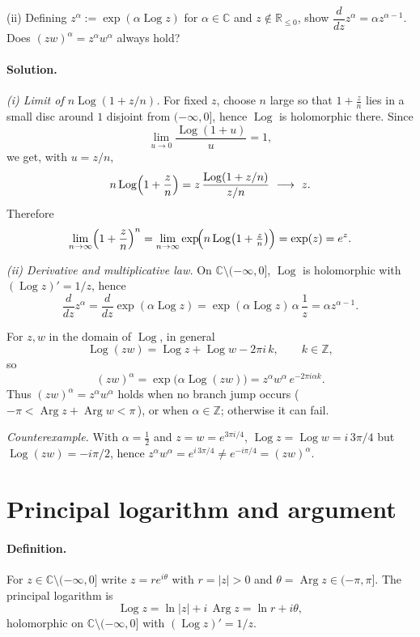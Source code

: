 \documentclass[11pt,a4paper]{article}
\theoremstyle{definition}
\theoremstyle{definition}
\theoremstyle{plain}
\theoremstyle{remark}
\DeclareMathOperator{\Log}{Log}
\DeclareMathOperator{\Arg}{Arg}
\begin{document}
(ii) Defining $z^\alpha:=\exp(\alpha\Log z)$ for $\alpha\in\mathbb C$ and $z\notin\mathbb R_{\le 0}$,
show $\dfrac{d}{dz}z^\alpha=\alpha z^{\alpha-1}$. Does $(zw)^\alpha=z^\alpha w^\alpha$ always hold?

\paragraph{Solution.}

\emph{(i) Limit of $n\Log(1+z/n)$.}
For fixed $z$, choose $n$ large so that $1+\frac{z}{n}$ lies in a small disc around $1$
disjoint from $(-\infty,0]$, hence $\Log$ is holomorphic there. Since
\[
\lim_{u\to 0}\frac{\Log(1+u)}{u}=1,
\]
we get, with $u=z/n$,
\[
n\Log\Bigl(1+\frac{z}{n}\Bigr)
= z\,\frac{\Log(1+z/n)}{z/n}\ \longrightarrow\ z.
\]
Therefore
\[
\lim_{n\to\infty}\Bigl(1+\frac{z}{n}\Bigr)^n
=\lim_{n\to\infty}\exp\!\Bigl(n\Log\bigl(1+\tfrac{z}{n}\bigr)\Bigr)
=\exp(z)=e^z.
\]

\emph{(ii) Derivative and multiplicative law.}
On $\mathbb C\setminus(-\infty,0]$, $\Log$ is holomorphic with $(\Log z)'=1/z$, hence
\[
\frac{d}{dz}z^\alpha
=\frac{d}{dz}\exp(\alpha\Log z)
=\exp(\alpha\Log z)\,\alpha\,\frac1z
=\alpha z^{\alpha-1}.
\]

For $z,w$ in the domain of $\Log$, in general
\[
\Log(zw)=\Log z+\Log w-2\pi i\,k,\qquad k\in\mathbb Z,
\]
so
\[
(zw)^\alpha
=\exp\!\bigl(\alpha\Log(zw)\bigr)
=z^\alpha w^\alpha\,e^{-2\pi i\alpha k}.
\]
Thus $(zw)^\alpha=z^\alpha w^\alpha$ holds when no branch jump occurs
(\,$-\pi<\Arg z+\Arg w<\pi$\,), or when $\alpha\in\mathbb Z$; otherwise it can fail.

\emph{Counterexample.} With $\alpha=\tfrac12$ and $z=w=e^{3\pi i/4}$,
$\Log z=\Log w=i\,3\pi/4$ but $\Log(zw)=-i\pi/2$, hence
$z^\alpha w^\alpha=e^{i\,3\pi/4}\neq e^{-i\pi/4}=(zw)^\alpha$.
	
\section*{Principal logarithm and argument}

\paragraph{Definition.}
For $z\in\mathbb{C}\setminus(-\infty,0]$ write $z=re^{i\theta}$ with $r=|z|>0$ and
$\theta=\Arg z\in(-\pi,\pi]$. The principal logarithm is
\[
\Log z=\ln|z|+i\,\Arg z=\ln r+i\theta,
\]
holomorphic on $\mathbb{C}\setminus(-\infty,0]$ with $(\Log z)'=1/z$.
\end{document}
